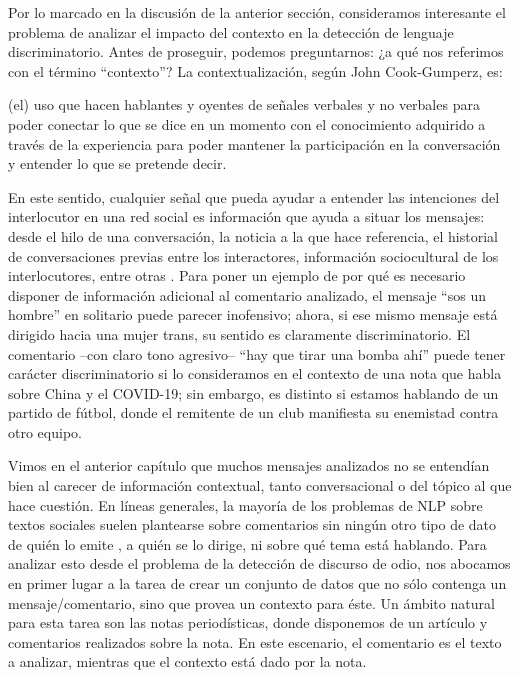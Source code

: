 \label{chap:05_dataset_creation}

Por lo marcado en la discusión de la anterior sección, consideramos interesante el problema de analizar el impacto del contexto en la detección de lenguaje discriminatorio. Antes de proseguir, podemos preguntarnos: ¿a qué nos referimos con el término ``contexto''? La contextualización, según John Cook-Gumperz, es:

\begin{displayquote}
    (el) uso que hacen hablantes y oyentes de señales verbales y no verbales para poder conectar lo que se dice en un momento con el conocimiento adquirido a través de la experiencia para poder mantener la participación en la conversación y entender lo que se pretende decir.
\end{displayquote}

En este sentido, cualquier señal que pueda ayudar a entender las intenciones del interlocutor en una red social es información que ayuda a situar los mensajes: desde el hilo de una conversación, la noticia a la que hace referencia, el historial de conversaciones previas entre los interactores, información sociocultural de los interlocutores, entre otras \cite{sheth2021defining}. Para poner un ejemplo de por qué es necesario disponer de información adicional al comentario analizado, el mensaje ``sos un hombre'' en solitario puede parecer inofensivo; ahora, si ese mismo mensaje está dirigido hacia una mujer trans, su sentido es claramente discriminatorio. El comentario --con claro tono agresivo-- ``hay que tirar una bomba ahí'' puede tener carácter discriminatorio si lo consideramos en el contexto de una nota que habla sobre China y el COVID-19; sin embargo, es distinto si estamos hablando de un partido de fútbol, donde el remitente de un club manifiesta su enemistad contra otro equipo.


Vimos en el anterior capítulo que muchos mensajes analizados no se entendían bien al carecer de información contextual, tanto conversacional o del tópico al que hace cuestión. En líneas generales, la mayoría de los problemas de NLP sobre textos sociales suelen plantearse sobre comentarios sin ningún otro tipo de dato de quién lo emite , a quién se lo dirige, ni sobre qué tema está hablando. Para analizar esto desde el problema de la detección de discurso de odio, nos abocamos en primer lugar a la tarea de crear un conjunto de datos que no sólo contenga un mensaje/comentario, sino que provea un contexto para éste. Un ámbito natural para esta tarea son las notas periodísticas, donde disponemos de un artículo y comentarios realizados sobre la nota. En este escenario, el comentario es el texto a analizar, mientras que el contexto está dado por la nota.

